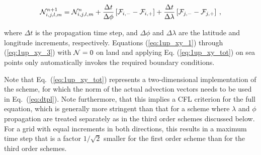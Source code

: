 \begin{equation}
\cN_{i,j,l,m}^{n+1} = \cN_{i,j,l,m}^n
  + \frac{\Delta t}{\Delta \phi   } \left [ \cF_{i,-} - \cF_{i,+} \right ]
  + \frac{\Delta t}{\Delta \lambda} \left [ \cF_{j,-} - \cF_{j,+} \right ]
\: , \label{eq:1up_xy_tot}
\end{equation}

\noindent
where $\Delta t$ is the propagation time step, and $\Delta \phi$ and $\Delta
\lambda$ are the latitude and longitude increments, respectively. Equations
(\ref{eq:1up_xy_1}) through (\ref{eq:1up_xy_3}) with ${\cal N}=0$ on land and
applying Eq. (\ref{eq:1up_xy_tot}) on sea points only automatically invokes
the required boundary conditions.

Note that Eq.~(\ref{eq:1up_xy_tot}) represents a two-dimensional
implementation of the scheme, for which the norm of the actual advection
vectors needs to be used in Eq.~(\ref{eq:dtpl}). Note furthermore, that this
implies a CFL criterion for the full equation, which is generally more
stringent than that for a scheme where $\lambda$ and $\phi$ propagation are
treated separately as in the third order schemes discussed below. For a grid
with equal increments in both directions, this results in a maximum time step
that is a factor $1/\sqrt{2}$ smaller for the first order scheme than for the
third order schemes.